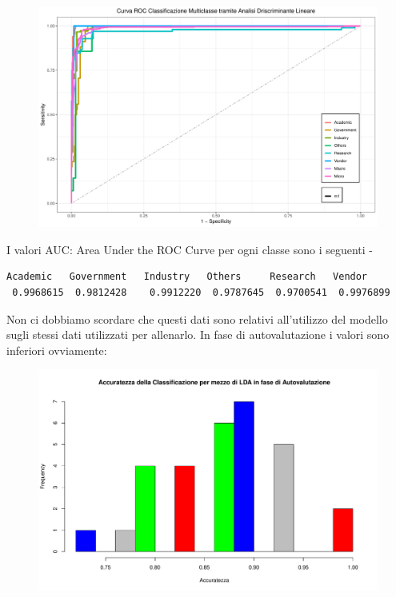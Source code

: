\documentclass[11pt,a4paper]{article}
\begin{document}
\begin{figure}[H]
	\vspace{-0.1cm}
	\hspace{-0.9cm}
	\includegraphics[scale=.59]{imgs/LDA_ggplot.pdf}
\end{figure}
\noindent I valori AUC: Area Under the ROC Curve per ogni classe sono i seguenti
\clearpage
-
\vspace{-1.22cm}
\begin{lstlisting}[language=bash,basicstyle=\scriptsize,tabsize=2,frame = single]
 Academic   Government   Industry   Others     Research   Vendor
 0.9968615  0.9812428    0.9912220  0.9787645  0.9700541  0.9976899
\end{lstlisting}
Non ci dobbiamo scordare che questi dati sono relativi all'utilizzo del modello
sugli stessi dati utilizzati per allenarlo. In fase di autovalutazione i valori
sono inferiori ovviamente:
\begin{figure}[H]
	\vspace{-0.5cm}
	\hspace{-0.9cm}
	\includegraphics[scale=.58]{imgs/LDA_hist.pdf}
\end{figure}
\end{document}
